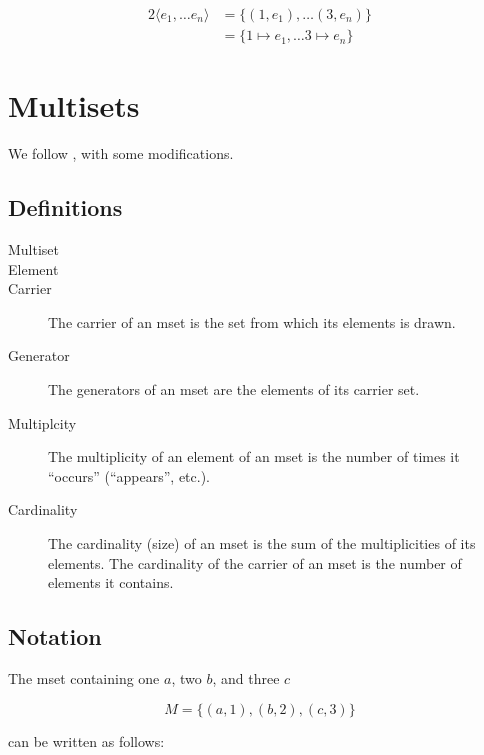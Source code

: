 \documentclass[reqno,12pt]{tufte-book}
\numberwithin{equation}{subsection}
\begin{document}
\begin{alignat}{2}
  \langle e_1,\ldots e_n\rangle &= \{(1,e_1),\ldots (3,e_n)\} \\
  &= \{1\mapsto e_1,\ldots 3\mapsto e_n\}
\end{alignat}

\section{Multisets}

We follow \citet{singh_overview_2007}, with some modifications.

\subsection{Definitions}

\begin{description}
\item [Multiset]
\item [Element]
\item [Carrier]  The carrier of an mset is the set from which its elements is drawn.
\item [Generator]  The generators of an mset are the elements of its carrier set.
\item [Multiplcity]  The multiplicity of an element of an mset is the number of times it ``occurs'' (``appears'', etc.).
\item [Cardinality] The cardinality (size) of an mset is the sum of
  the multiplicities of its elements.  The cardinality of the carrier of an mset is the number of elements it contains.
\end{description}

\subsection{Notation}

The mset containing one $a$, two $b$, and three $c$

\begin{equation}
  M = \{(a,1), (b,2), (c, 3)\}
\end{equation}

\noindent can be written as follows:
\end{document}
